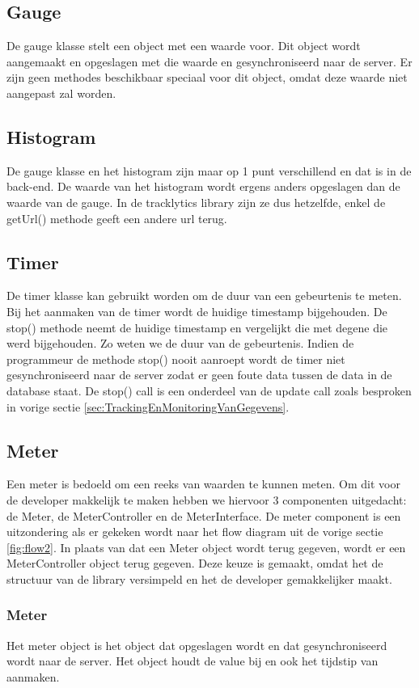 \subsection{Gauge}
De gauge klasse stelt een object met een waarde voor. Dit object wordt aangemaakt en opgeslagen met die waarde en gesynchroniseerd naar de server. Er zijn geen methodes beschikbaar speciaal voor dit object, omdat deze waarde niet aangepast zal worden.

\subsection{Histogram}
De gauge klasse en het histogram zijn maar op 1 punt verschillend en dat is in de back-end. De waarde van het histogram wordt ergens anders opgeslagen dan de waarde van de gauge. In de tracklytics library zijn ze dus hetzelfde, enkel de getUrl() methode geeft een andere url terug.

\subsection{Timer}
De timer klasse kan gebruikt worden om de duur van een gebeurtenis te meten. Bij het aanmaken van de timer wordt de huidige timestamp bijgehouden. De stop() methode neemt de huidige timestamp en vergelijkt die met degene die werd bijgehouden. Zo weten we de duur van de gebeurtenis. Indien de programmeur de methode stop() nooit aanroept wordt de timer niet gesynchroniseerd naar de server zodat er geen foute data tussen de data in de database staat. De stop() call is een onderdeel van de update call zoals besproken in vorige sectie \ref{sec:TrackingEnMonitoringVanGegevens}.

\subsection{Meter}
Een meter is bedoeld om een reeks van waarden te kunnen meten. Om dit voor de developer makkelijk te maken hebben we hiervoor 3 componenten uitgedacht: de Meter, de MeterController en de MeterInterface. De meter component is een uitzondering als er gekeken wordt naar het flow diagram uit de vorige sectie \ref{fig:flow2}. In plaats van dat een Meter object wordt terug gegeven, wordt er een MeterController object terug gegeven. Deze keuze is gemaakt, omdat het de structuur van de library versimpeld en het de developer gemakkelijker maakt.

\subsubsection{Meter}
Het meter object is het object dat opgeslagen wordt en dat gesynchroniseerd wordt naar de server. Het object houdt de value bij en ook het tijdstip van aanmaken.

